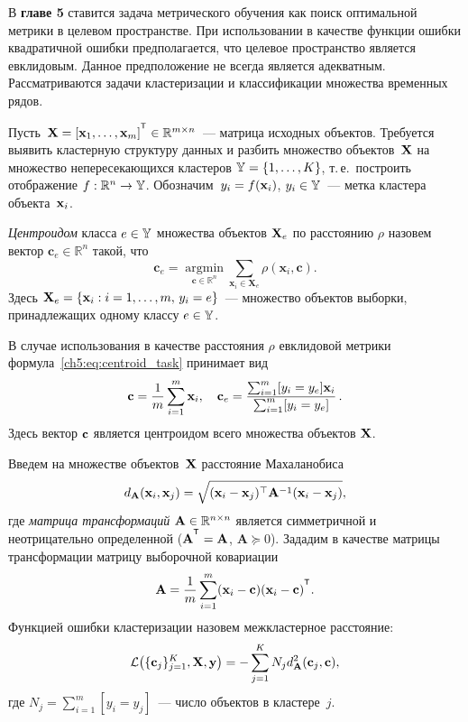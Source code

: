 \documentclass[11pt, a5paper]{dissert}
\begin{document}
В \textbf{главе 5} ставится задача метрического обучения как поиск оптимальной метрики в целевом пространстве.
При использовании в качестве функции ошибки квадратичной ошибки предполагается, что целевое пространство является евклидовым. 
Данное предположение не всегда является адекватным.
Рассматриваются задачи кластеризации и классификации множества временных рядов.

Пусть~$\bX = [\bx_1, \dots, \bx_m]^{\T} \in \mathbb{R}^{m \times n}$~--- матрица исходных объектов.
Требуется выявить кластерную структуру данных и разбить множество объектов~$\mathbf{X}$ на множество непересекающихся кластеров $\mathbb{Y} = \{1, \dots, K\}$, т.\,е.\ построить отображение $f: \mathbb{R}^n \to \mathbb{Y}$.
Обозначим~$y_i = f (\mathbf{x}_i)$, $y_i \in \mathbb{Y}$~--- метка кластера объекта~$\mathbf{x}_i$.
\begin{definition}
	\label{ch5:def:centroid}
	\textit{Центроидом} класса $e \in \mathbb{Y}$ множества объектов $\mathbf{X}_e$ по расстоянию $\rho$ назовем вектор $\mathbf{c}_e \in \mathbb{R}^n$ такой, что
	\begin{equation}
		\label{ch5:eq:centroid_task}
		\mathbf{c}_e = \mathop{\text{argmin}}\limits_{{\mathbf{c} \in \mathbb{R}^n}}\sum_{\mathbf{x}_i \in \mathbf{X}_e}
		{\rho(\mathbf{x}_i ,\mathbf{c})}.
	\end{equation}
	Здесь $\mathbf{X}_e = \{\mathbf{x}_i: i=1, \dots, m, \, y_i=e\}$~--- множество объектов выборки, принадлежащих одному классу $e \in \mathbb{Y}$.
\end{definition}
В случае использования в качестве расстояния $\rho$ евклидовой метрики формула~\eqref{ch5:eq:centroid_task} принимает вид
\begin{equation}
	\label{ch5:eq:mu}
	\mathbf{c} =\frac{1}{m} \sum_{i=1}^m\mathbf{x}_i, \quad
	\mathbf{c}_e =\frac{ \sum_{i=1}^m [y_i = y_e]\mathbf{x}_i } {\sum_{i=1}^m [y_i = y_e]}\,.
\end{equation}
Здесь вектор $\mathbf{c}$ является центроидом всего множества объектов $\mathbf{X}$.

Введем на множестве объектов~$\mathbf{X}$ расстояние Махаланобиса
\begin{equation}
	d_{\mathbf{A}} (\mathbf{x}_i, \mathbf{x}_j) = \sqrt{(\mathbf{x}_i - \mathbf{x}_j)^{\top} \mathbf{A}^{-1} (\mathbf{x}_i - \mathbf{x}_j)},
	\label{ch5:eq:mahal_distance}
\end{equation}
где \textit{матрица трансформаций} $\mathbf{A} \in \mathbb{R}^{n \times n}$ является симметричной и неотрицательно определенной ($\mathbf{A}^{\T} = \mathbf{A}$, $\mathbf{A} \succeq 0$).
Зададим в качестве матрицы трансформации матрицу выборочной ковариации
\begin{equation}
	\label{ch5:eq:covMatrix}
	\bA = \frac{1}{m} \sum_{i=1}^m(\bx_i - \bc)(\bx_i - \bc)^{\T}.
\end{equation}
Функцией ошибки кластеризации назовем межкластерное расстояние:
\begin{equation}
	\mathcal{L} \bigl(\{\mathbf{c}_j\}_{j=1}^K, \mathbf{X}, \mathbf{y}\bigr)= - \sum_{j=1}^K N_j d_{\mathbf{A}}^2(\mathbf{c}_j, \mathbf{c}),
	\label{ch5:eq:cluster_error_function}
\end{equation}
где $N_j = \sum_{i=1}^m [y_i = y_j]$~--- число объектов в кластере~$j$.
\end{document}
